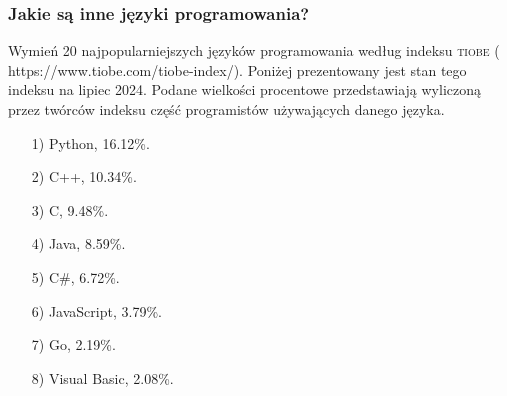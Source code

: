 \documentclass[10pt,t]{beamer}
\begin{document}
\begin{frame}
  \frametitle{Jakie są inne języki programowania?}


  Wymień 20 najpopularniejszych języków programowania według indeksu
  \textsc{tiobe} (
  {https://www.tiobe.com/tiobe-index/}). Poniżej prezentowany jest stan
  tego indeksu na lipiec 2024. Podane wielkości procentowe przedstawiają
  wyliczoną przez twórców indeksu część programistów używających danego
  języka.

  \begin{itemize}

  \item[1)] Python, 16.12\%.

  \item[2)] C++, 10.34\%.

  \item[3)] C, 9.48\%.

  \item[4)] Java, 8.59\%.

  \item[5)] C\#, 6.72\%.

  \item[6)] JavaScript, 3.79\%.

  \item[7)] Go, 2.19\%.

  \item[8)] Visual Basic, 2.08\%.

  \end{itemize}

\end{frame}
\end{document}
